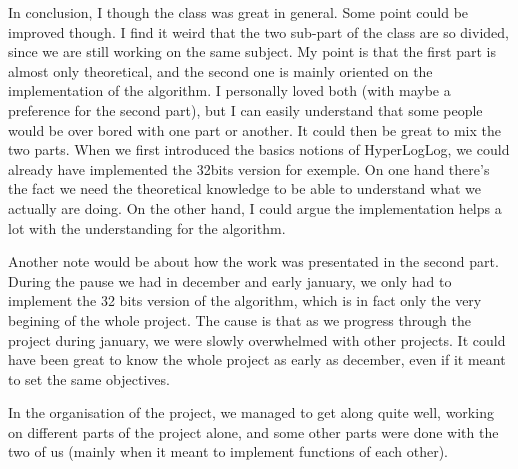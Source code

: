 \documentclass{article}
\begin{document}
 In conclusion, I though the class was great in general. Some point
 could be improved though. I find it weird that the two sub-part of
 the class are so divided, since we are still working on the same
 subject. My point is that the first part is almost only theoretical,
 and the second one is mainly oriented on the implementation of the
 algorithm.  I personally loved both (with maybe a preference for the
 second part), but I can easily understand that some people would be
 over bored with one part or another. It could then be great to mix
 the two parts. When we first introduced the basics notions of
 HyperLogLog, we could already have implemented the 32bits version for
 exemple.  On one hand there's the fact we need the theoretical
 knowledge to be able to understand what we actually are doing.  On
 the other hand, I could argue the implementation helps a lot with the
 understanding for the algorithm.

 Another note would be about how the work was presentated in the
 second part. During the pause we had in december and early january,
 we only had to implement the 32 bits version of the algorithm, which
 is in fact only the very begining of the whole project. The cause is
 that as we progress through the project during january, we were
 slowly overwhelmed with other projects. It could have been great to
 know the whole project as early as december, even if it meant to set
 the same objectives.

 In the organisation of the project, we managed to get along quite
 well, working on different parts of the project alone, and some other
 parts were done with the two of us (mainly when it meant to implement
 functions of each other).
 
\end{document}
